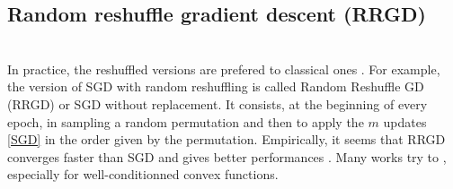 \documentclass[article,authoryear,jmlmc]{beg_32}             %
\begin{document}
\subsection{Random reshuffle gradient descent (RRGD)}
~~\\
In practice, the reshuffled versions are prefered to classical ones \cite{RR_use1,RR_use2,RG_mean}. For example, the version of SGD with random reshuffling is called Random
Reshuffle GD (RRGD) or SGD without replacement. It consists, at the beginning of every epoch, in sampling a random permutation and then to apply the $m$ updates \eqref{SGD} in the
order given by the permutation. Empirically, it seems that RRGD converges faster than SGD and gives better performances \cite{RR_use1,RR_use_superior}. Many works
\cite{RR_outperforms_quadratics,RR_use3,RR_outperforms_convex,RR_small_epochs} try to , especially for well-conditionned convex functions.
\end{document}
